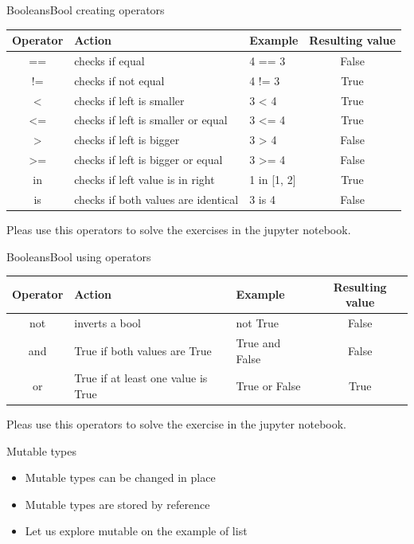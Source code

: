 \documentclass[aspectratio=169]{beamer}
\begin{document}
\begin{frame}{Booleans}{Bool creating operators}
\begin{tabular}{cllc}
\toprule
	Operator & Action & Example & Resulting value \\
\midrule
	== & checks if equal                     & 4 == 3      & False \\
	!= & checks if not equal                 & 4 != 3      & True  \\
	<  & checks if left is smaller           & 3 < 4       & True  \\
	<= & checks if left is smaller or equal  & 3 <= 4      & True  \\
	>  & checks if left is bigger            & 3 > 4       & False \\
	>= & checks if left is bigger or equal   & 3 >= 4      & False \\
	in & checks if left value is in right    & 1 in [1, 2] & True \\
	is & checks if both values are identical & 3 is 4      & False\\
\bottomrule
\end{tabular}

\vspace{2em}

Pleas use this operators to solve the exercises in the jupyter notebook.

\end{frame}

\begin{frame}{Booleans}{Bool using operators}
\begin{tabular}{cllc}
\toprule
	Operator & Action & Example & Resulting value \\
\midrule
	not & inverts a bool                     & not True       & False \\
	and & True if both values are True       & True and False & False\\
	or  & True if at least one value is True & True or False  & True  \\
\bottomrule
\end{tabular}

\vspace{2em}

Pleas use this operators to solve the exercise in the jupyter notebook.

\end{frame}

\begin{frame}{Mutable types}
\begin{itemize}
	\item Mutable types can be changed in place
	\item Mutable types are stored by reference
	\item Let us explore mutable on the example of list
\end{itemize}
\end{frame}
\end{document}
